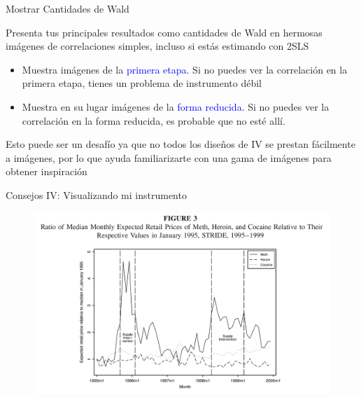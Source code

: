 \documentclass{beamer}
\begin{document}
\begin{frame}{Mostrar Cantidades de Wald}

Presenta tus principales resultados como cantidades de Wald en hermosas imágenes de correlaciones simples, incluso si estás estimando con 2SLS
	\begin{itemize}
	\item Muestra imágenes de la \textcolor{blue}{primera etapa}. Si no puedes ver la correlación en la primera etapa, tienes un problema de instrumento débil
	\item Muestra en su lugar imágenes de la \textcolor{blue}{forma reducida}. Si no puedes ver la correlación en la forma reducida, es probable que no esté allí.
	\end{itemize}
	
	\bigskip
	
Esto puede ser un desafío ya que no todos los diseños de IV se prestan fácilmente a imágenes, por lo que ayuda familiarizarte con una gama de imágenes para obtener inspiración

\end{frame}

\begin{frame}{Consejos IV: Visualizando mi instrumento}
	
	\begin{figure}
	\includegraphics[scale=0.15]{./lecture_includes/keith_1.png}
	\end{figure}
	
\end{frame}
\end{document}
